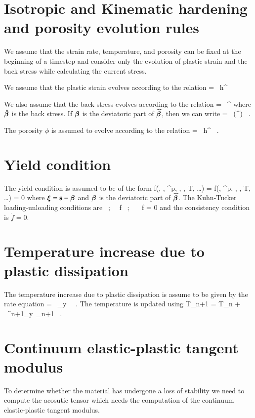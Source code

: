 \documentclass[twoside,10pt,a4paper]{article}
\begin{document}
\section{Isotropic and Kinematic hardening and porosity evolution rules}
We assume that the strain rate, temperature, and porosity can be fixed at the
beginning of a timestep and consider only the evolution of plastic strain and
the back stress while calculating the current stress.

We assume that the plastic strain evolves according to the relation
\Beq
   = \dot{\gamma}~h^{\alpha}
\Eeq

We also assume that the back stress evolves according to the relation
\Beq
  \dot{\widehat{\Bbeta}} = \dot{\gamma}~\Bh^{\beta}
\Eeq
where $\hat{\Bbeta}$ is the back stress.  If $\Bbeta$ is the deviatoric part of
$\widehat{\Bbeta}$, then we can write
\Beq
  \dot{\Bbeta} = \dot{\gamma}~\Dev(\Bh^{\beta}) ~.
\Eeq

The porosity $\phi$ is assumed to evolve according to the relation
\Beq
  \dot{\phi} = \dot{\gamma}~h^{\phi} ~.
\Eeq

\section{Yield condition}
The yield condition is assumed to be of the form
\Beq
  f(\Bs, \Bbeta, \Ve^p, \phi, \dot{\Ve}, T, \dots) 
    = f(\Bxi, \Ve^p, \phi, \dot{\Ve}, T, \dots) = 0
\Eeq
where $\Bxi = \Bs - \Bbeta$ and $\Bbeta$ is the deviatoric part of $\widehat{\Bbeta}$.  
The Kuhn-Tucker loading-unloading conditions are
\Beq
  \dot{\gamma}  ~;~~  f  ~;~~ \dot{\gamma}~f = 0
\Eeq
and the consistency condition is $\dot{f} = 0$.

\section{Temperature increase due to plastic dissipation}
The temperature increase due to plastic dissipation is assume to be
given by the rate equation
\Beq
   = ~\sigma_y~ ~.
\Eeq
The temperature is updated using
\Beq
  T_{n+1} = T_n + 
   ~\sigma^{n+1}_y~_{n+1} ~.
\Eeq

\section{Continuum elastic-plastic tangent modulus}
To determine whether the material has undergone a loss of stability we need to compute
the acosutic tensor which needs the computation of the continuum elastic-plastic tangent
modulus.
\end{document}
